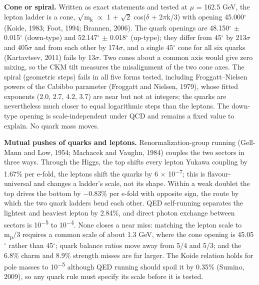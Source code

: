 \documentclass[
  11pt,
]{article}
\begin{document}
\textbf{Cone or spiral.} Written as exact statements and tested at \ensuremath{\mu} = 162.5 GeV, the lepton ladder is a cone, \ensuremath{\surd}m\textsubscript{k} \ensuremath{\propto} 1 + \ensuremath{\sqrt{2}} cos(\ensuremath{\delta} + 2\ensuremath{\pi}k/3) with opening 45.000\ensuremath{^\circ} (Koide, 1983; Foot, 1994; Brannen, 2006). The quark openings are 48.150\ensuremath{^\circ} \ensuremath{\pm} 0.015\ensuremath{^\circ} (down-type) and 52.147\ensuremath{^\circ} \ensuremath{\pm} 0.018\ensuremath{^\circ} (up-type); they differ from 45\ensuremath{^\circ} by 213\ensuremath{\sigma} and 405\ensuremath{\sigma} and from each other by 174\ensuremath{\sigma}, and a single 45\ensuremath{^\circ} cone for all six quarks (Kartavtsev, 2011) fails by 13\ensuremath{\sigma}. Two cones about a common axis would give zero mixing, so the CKM tilt measures the misalignment of the two cone axes. The spiral (geometric steps) fails in all five forms tested, including Froggatt--Nielsen powers of the Cabibbo parameter (Froggatt and Nielsen, 1979), whose fitted exponents (2.0, 2.7, 4.2, 3.7) are near but not at integers; the quarks are nevertheless much closer to equal logarithmic steps than the leptons. The down-type opening is scale-independent under QCD and remains a fixed value to explain. No quark mass moves.

\textbf{Mutual pushes of quarks and leptons.} Renormalization-group running (Gell-Mann and Low, 1954; Machacek and Vaughn, 1984) couples the two sectors in three ways. Through the Higgs, the top shifts every lepton Yukawa coupling by 1.67\% per e-fold, the leptons shift the quarks by 6 \ensuremath{\times} 10\textsuperscript{\ensuremath{-}7}; this is flavour-universal and changes a ladder's scale, not its shape. Within a weak doublet the top drives the bottom by \ensuremath{-}0.83\% per e-fold with opposite sign, the route by which the two quark ladders bend each other. QED self-running separates the lightest and heaviest lepton by 2.84\%, and direct photon exchange between sectors is 10\textsuperscript{\ensuremath{-}5} to 10\textsuperscript{\ensuremath{-}4}. None closes a near miss: matching the lepton scale to m\textsubscript{p}/3 requires a common scale of about 1.3 GeV, where the cone opening is 45.05\ensuremath{^\circ} rather than 45\ensuremath{^\circ}; quark balance ratios move away from 5/4 and 5/3; and the 6.8\% charm and 8.9\% strength misses are far larger. The Koide relation holds for pole masses to 10\textsuperscript{\ensuremath{-}5} although QED running should spoil it by 0.35\% (Sumino, 2009), so any quark rule must specify its scale before it is tested.
\end{document}
